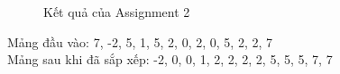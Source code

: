 \documentclass[a4paper,12pt]{article}
\begin{document}
\begin{figure}[!h]
	\centerline{}
	\caption{Kết quả của Assignment 2}
	\label{fig:ass2}
\end{figure}
\noindent
Mảng đầu vào: 7, -2, 5, 1, 5, 2, 0, 2, 0, 5, 2, 2, 7 \\
Mảng sau khi đã sắp xếp: -2, 0, 0, 1, 2, 2, 2, 2, 5, 5, 5, 7, 7 
\clearpage
\end{document}
